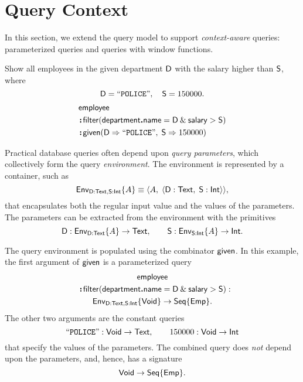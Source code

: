 
\section{Query Context}
\label{sec:context}

In this section, we extend the query model to support \emph{context-aware}
queries: parameterized queries and queries with window functions.

\begin{demo}
    \label{ex:parameters}
    Show all employees in the given department $\mathsf{D}$ with the salary
    higher than $\mathsf{S}$, where
    \begin{equation*}
        \mathsf{D}=\mathtt{``POLICE"}, \quad \mathsf{S}=150000.
    \end{equation*}
    \begin{align*}
        & \mathsf{employee} \\
        & \!\boldsymbol{:}\!\mathsf{filter}(\mathsf{department}\boldsymbol{.}\mathsf{name} = \mathsf{D} \mathbin{\&} \mathsf{salary} > \mathsf{S}) \\
        & \!\boldsymbol{:}\!\mathsf{given}(\mathsf{D} \Rightarrow \mathtt{``POLICE"},\; \mathsf{S} \Rightarrow 150000)
    \end{align*}
\end{demo}

Practical database queries often depend upon \emph{query parameters}, which
collectively form the query \emph{environment}.  The environment is represented
by a container, such as
\begin{equation*}
    \mathsf{Env}_{\mathsf{D}:\mathsf{Text},\mathsf{S}:\mathsf{Int}}{\left\{A\right\}} \equiv \langle A,\; \langle \mathsf{D}:\mathsf{Text},\; \mathsf{S}:\mathsf{Int} \rangle \rangle,
\end{equation*}
that encapsulates both the regular input value and the values of the
parameters.  The parameters can be extracted from the environment with the
primitives
\begin{equation*}
    \mathsf{D} : \mathsf{Env}_{\mathsf{D}:\mathsf{Text}}{\left\{A\right\}} \to \mathsf{Text}, \qquad
    \mathsf{S} : \mathsf{Env}_{\mathsf{S}:\mathsf{Int}}{\left\{A\right\}} \to \mathsf{Int}.
\end{equation*}

The query environment is populated using the combinator $\mathsf{given}$.  In this
example, the first argument of $\mathsf{given}$ is a parameterized query
\begin{multline*}
    \Employee \\
    \shoveleft{\Apply\Filter(\Department\To\Name = \DEPARTMENT \mathbin{\&} \Salary > \SALARY) : } \\
    \Env{\DEPARTMENT:\Text,\SALARY:\Int}{\Void} \to \Seq{\Emp}.
\end{multline*}
The other two arguments are the constant queries
\begin{equation*}
    \mathtt{``POLICE"} : \mathsf{Void} \to \mathsf{Text}, \qquad
    150000 : \mathsf{Void} \to \mathsf{Int}
\end{equation*}
that specify the values of the parameters.  The combined query does \emph{not}
depend upon the parameters, and, hence, has a signature
\begin{equation*}
    \mathsf{Void} \to \mathsf{Seq}{\left\{\mathsf{Emp}\right\}}.
\end{equation*}

